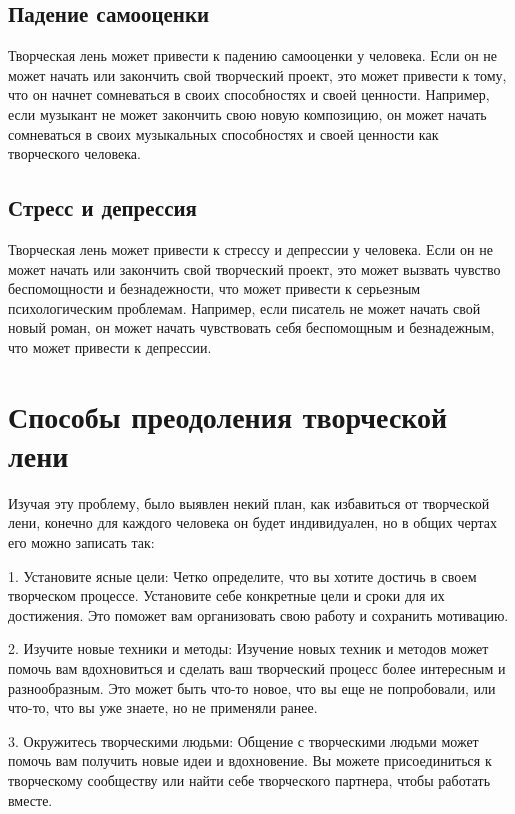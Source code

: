 \documentclass[a4paper, 14pt]{article}
\begin{document}
\subsection{Падение самооценки}
Творческая лень может привести к падению самооценки у человека. Если он не может начать или закончить свой творческий проект, это может привести к тому, что он начнет сомневаться в своих способностях и своей ценности.
Например, если музыкант не может закончить свою новую композицию, он может начать сомневаться в своих музыкальных способностях и своей ценности как творческого человека.

\subsection{Стресс и депрессия}
Творческая лень может привести к стрессу и депрессии у человека. Если он не может начать или закончить свой творческий проект, это может вызвать чувство беспомощности и безнадежности, что может привести к серьезным психологическим проблемам.
Например, если писатель не может начать свой новый роман, он может начать чувствовать себя беспомощным и безнадежным, что может привести к депрессии.





\section{Способы преодоления творческой лени}

Изучая эту проблему, было выявлен некий план, как избавиться от творческой лени, конечно для каждого человека он будет индивидуален, но в общих чертах его можно записать так:

1. Установите ясные цели: Четко определите, что вы хотите достичь в своем творческом процессе. Установите себе конкретные цели и сроки для их достижения. Это поможет вам организовать свою работу и сохранить мотивацию.

2. Изучите новые техники и методы: Изучение новых техник и методов может помочь вам вдохновиться и сделать ваш творческий процесс более интересным и разнообразным. Это может быть что-то новое, что вы еще не попробовали, или что-то, что вы уже знаете, но не применяли ранее.

3. Окружитесь творческими людьми: Общение с творческими людьми может помочь вам получить новые идеи и вдохновение. Вы можете присоединиться к творческому сообществу или найти себе творческого партнера, чтобы работать вместе.
\end{document}
